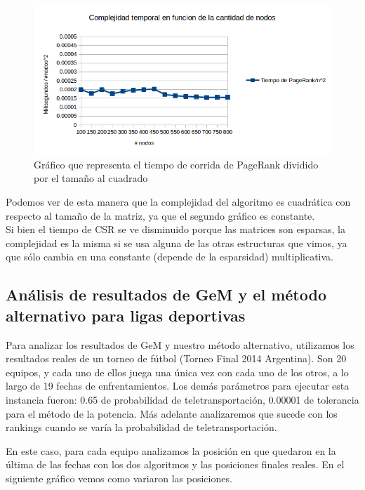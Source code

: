 \begin{figure}[h]
   \begin{center}
     \includegraphics[scale= 0.8]{imagenes/complejidadlineal.png}
   \end{center}
   \caption{Gráfico que representa el tiempo de corrida de PageRank dividido por el tamaño al cuadrado}
  \label{fig:lin}
\end{figure}

 Podemos ver de esta manera que la complejidad del algoritmo es cuadrática con respecto al tamaño de la matriz, ya que el segundo gráfico es constante. \\

Si bien el tiempo de CSR se ve disminuido porque las matrices son esparsas, la complejidad es la misma si se usa alguna de las otras estructuras que vimos, ya que sólo cambia en una constante (depende de la esparsidad) multiplicativa. \\

\newpage

\subsection{Análisis de resultados de GeM y el método alternativo para ligas deportivas}

Para analizar los resultados de GeM y nuestro método alternativo, utilizamos los resultados reales de un torneo de fútbol (Torneo Final 2014 Argentina). Son 20 equipos, y cada uno de ellos juega una única vez con cada uno de los otros, a lo largo de 19 fechas de enfrentamientos. Los demás parámetros para ejecutar esta instancia fueron: 0.65 de probabilidad de teletransportación, 0.00001 de tolerancia para el método de la potencia. Más adelante analizaremos que sucede con los rankings cuando se varía la probabilidad de teletransportación.

En este caso, para cada equipo analizamos la posición en que quedaron en la última de las fechas con los dos algoritmos y las posiciones finales reales. En el siguiente gráfico vemos como variaron las posiciones. 


